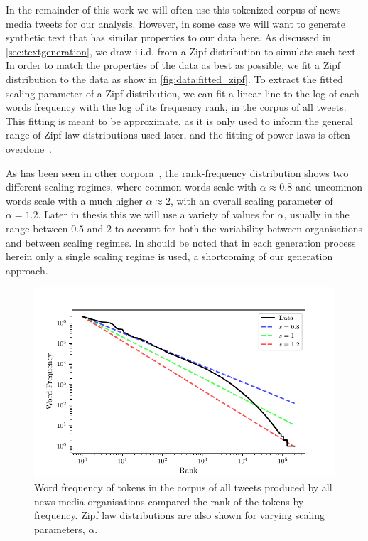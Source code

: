 In the remainder of this work we will often use this tokenized corpus of news-media tweets for our analysis. However, in some case we will want to generate synthetic text that has similar properties to our data here. As discussed in \autoref{sec:textgeneration}, we draw i.i.d. from a Zipf distribution to simulate such text. In order to match the properties of the data as best as possible, we fit a Zipf distribution to the data as show in \autoref{fig:data:fitted_zipf}. To extract the fitted scaling parameter of a Zipf distribution, we can fit a linear line to the log of each words frequency with the log of its frequency rank, in the corpus of all tweets. This fitting is meant to be approximate, as it is only used to inform the general range of Zipf law distributions used later, and the fitting of power-laws is often overdone~\cite{broidoScalefreeNetworksAre2019}. 

As has been seen in other corpora~\cite{williams_text_2015,naranan1998models, gerlach2013stochastic}, the rank-frequency distribution shows two different scaling regimes, where common words scale with $\alpha\approx 0.8$ and uncommon words scale with a much higher $\alpha \approx 2$, with an overall scaling parameter of $\alpha=1.2$. Later in thesis this we will use a variety of values for $\alpha$, usually in the range between $0.5$ and $2$ to account for both the variability between organisations and between scaling regimes. In should be noted that in each generation process herein only a single scaling regime is used, a shortcoming of our generation approach.


\begin{figure}[!htbp]
\centering
\includegraphics{chapter1/figs/fitted_zipf.pdf}
\caption{Word frequency of tokens in the corpus of all tweets produced by all news-media organisations compared the rank of the tokens by frequency. Zipf law distributions are also shown for varying scaling parameters, $\alpha$. \label{fig:data:fitted_zipf}}
\end{figure} 



